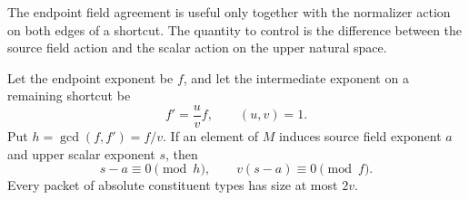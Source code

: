 The endpoint field agreement is useful only together with the
normalizer action on both edges of a shortcut.  The quantity
to control is the difference between the source field action
and the scalar action on the upper natural space.

\begin{lemma}
\label{pkt:field-shifts}
Let the endpoint exponent be $f$, and let the intermediate
exponent on a remaining shortcut be
\[
                f'=\frac uv f,\qquad (u,v)=1.
\]
Put $h=\gcd(f,f')=f/v$.  If an element of $M$ induces source
field exponent $a$ and upper scalar exponent $s$, then
\begin{equation}
                   s-a\equiv0\pmod h,\qquad
                   v(s-a)\equiv0\pmod f.
\label{pkt:shift-congruence}
\end{equation}
Every packet of absolute
constituent types has size at most $2v$.
\end{lemma}

